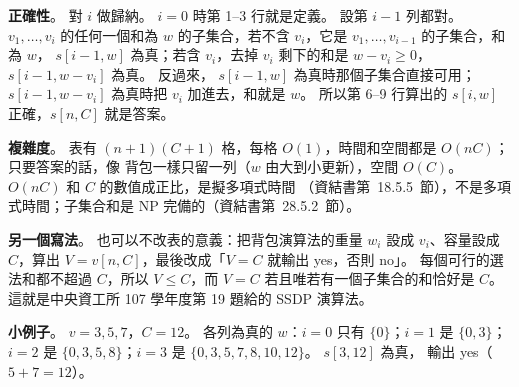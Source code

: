 \begin{pastsoln}
\textbf{正確性}。 對 $i$ 做歸納。 $i = 0$ 時第 1--3 行就是定義。 設第 $i - 1$ 列都對。 $v_1, \ldots,
v_i$ 的任何一個和為 $w$ 的子集合，若不含 $v_i$，它是 $v_1, \ldots, v_{i-1}$ 的子集合，和為 $w$，
$s[i-1, w]$ 為真；若含 $v_i$，去掉 $v_i$ 剩下的和是 $w - v_i \ge 0$，$s[i-1, w - v_i]$ 為真。 反過來，
$s[i-1, w]$ 為真時那個子集合直接可用；$s[i-1, w - v_i]$ 為真時把 $v_i$ 加進去，和就是 $w$。 所以第
6--9 行算出的 $s[i, w]$ 正確，$s[n, C]$ 就是答案。

\textbf{複雜度}。 表有 $(n + 1)(C + 1)$ 格，每格 $O(1)$，時間和空間都是 $O(nC)$；只要答案的話，像
背包一樣只留一列（$w$ 由大到小更新），空間 $O(C)$。 $O(nC)$ 和 $C$ 的數值成正比，是擬多項式時間
（資結書第~18.5.5~節），不是多項式時間；子集合和是 NP 完備的（資結書第~28.5.2~節）。

\textbf{另一個寫法}。 也可以不改表的意義：把背包演算法的重量 $w_i$ 設成 $v_i$、容量設成 $C$，算出
$V = v[n, C]$，最後改成「$V = C$ 就輸出 yes，否則 no」。 每個可行的選法和都不超過 $C$，所以
$V \le C$，而 $V = C$ 若且唯若有一個子集合的和恰好是 $C$。 這就是中央資工所 107 學年度第 19 題給的
SSDP 演算法。

\textbf{小例子}。 $v = 3, 5, 7$，$C = 12$。 各列為真的 $w$：$i = 0$ 只有 $\{0\}$；$i = 1$ 是
$\{0, 3\}$；$i = 2$ 是 $\{0, 3, 5, 8\}$；$i = 3$ 是 $\{0, 3, 5, 7, 8, 10, 12\}$。 $s[3, 12]$ 為真，
輸出 yes（$5 + 7 = 12$）。
\end{pastsoln}
